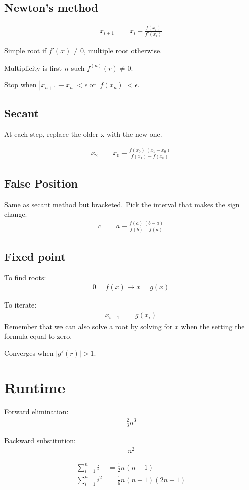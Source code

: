\documentclass[12pt]{article}
\newcommand{\straight}[1]{\left|       #1 \right|}
\begin{document}
\subsection*{Newton's method}
\begin{align*}
    x_{i + 1} &= x_i - \frac{f(x_i)}{f'(x_i)}
\end{align*}

Simple root if $f'(x) \neq 0$, multiple root otherwise.

Multiplicity is first $n$ such $f^{(n)}(r) \neq 0$.

Stop when $\straight{x_{n+1} - x_n} < \epsilon$ or $\straight{f(x_n)} < \epsilon$.

\subsection*{Secant}
At each step, replace the older x with the new one.

\begin{align*}
    x_2 &= x_0 - \frac{f(x_0)\ (x_1 - x_0)}{f(x_1) - f(x_0)}
\end{align*}

\subsection*{False Position}
Same as secant method but bracketed. Pick the interval that makes the sign change.
\begin{align*}
    c &= a - \frac{f(a)\ (b - a)}{f(b) - f(a)}
\end{align*}

\subsection*{Fixed point}
To find roots:
\begin{align*}
    0 = f(x) \rightarrow x = g(x)
\end{align*}

To iterate:
\begin{align*}
    x_{i+1} &= g(x_i)
\end{align*}
Remember that we can also solve a root by solving for $x$ when the setting the formula equal to zero.

Converges when $\straight{g'(r)} > 1$.

\section*{Runtime}
Forward elimination:
\begin{align*}
    \frac{2}{3}n^3
\end{align*}

Backward substitution:
\begin{align*}
    n^2
\end{align*}

\begin{align*}
    \sum_{i=1}^n i &= \frac{1}{2}n (n + 1) \\
    \sum_{i=1}^n i^2 &= \frac{1}{6} n (n + 1) (2n + 1)
\end{align*}
\end{document}
